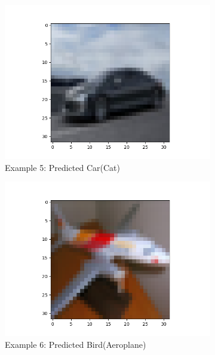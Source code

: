 \documentclass[11pt]{article}
\begin{document}
\begin{figure}[H]
\begin{subfigure}[b]{0.3\textwidth}
        \includegraphics[width=\linewidth]{misB5.png}
        \caption{Example 5: Predicted Car(Cat)}
    \end{subfigure}
    \begin{subfigure}[b]{0.3\textwidth}
        \centering
        \includegraphics[width=\linewidth]{misB6.png}
        \caption{Example 6: Predicted Bird(Aeroplane)}
    \end{subfigure} 
    \medskip
    \begin{subfigure}[b]{0.3\textwidth}
        \centering

\end{subfigure}
\end{figure}
\end{document}
